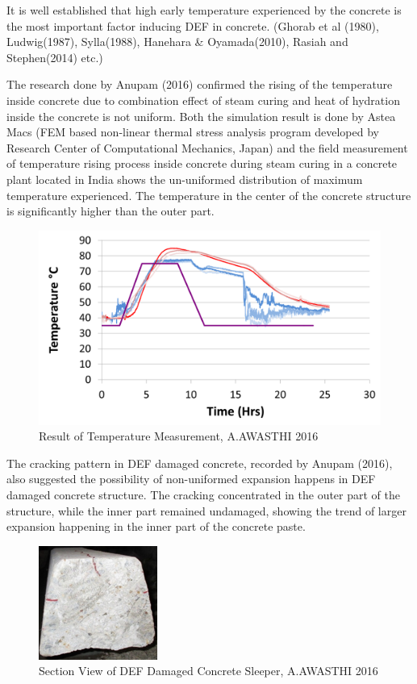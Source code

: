 It is well established that high early temperature experienced by the concrete is the most important factor inducing DEF in concrete. (Ghorab et al (1980), Ludwig(1987), Sylla(1988), Hanehara \& Oyamada(2010), Rasiah and Stephen(2014) etc.)

The research done by Anupam (2016) confirmed the rising of the temperature inside concrete due to combination effect of steam curing and heat of hydration inside the concrete is not uniform. Both the simulation result is done by Astea Macs (FEM based non-linear thermal stress analysis program developed by Research Center of Computational Mechanics, Japan) and the field measurement of temperature rising process inside concrete during steam curing in a concrete plant located in India shows the un-uniformed distribution of maximum temperature experienced. The temperature in the center of the concrete structure is significantly higher than the outer part.

\begin{figure}[ht!]
\centering
\includegraphics[width=.6\linewidth]{Files/Background/Anupam_2.png}
  \caption{Result of Temperature Measurement, A.AWASTHI 2016}
  \label{fig:temp_measurement}
\end{figure}


The cracking pattern in DEF damaged concrete, recorded by Anupam (2016), also suggested the possibility of non-uniformed expansion happens in DEF damaged concrete structure. The cracking concentrated in the outer part of the structure, while the inner part remained undamaged, showing the trend of larger expansion happening in the inner part of the concrete paste.

\begin{figure}[ht!]
\centering
\includegraphics[width=.4\linewidth]{Files/Background/Anupam_5.png}
  \caption{Section View of DEF Damaged Concrete Sleeper, A.AWASTHI 2016}
  \label{fig:section_view}
\end{figure}

